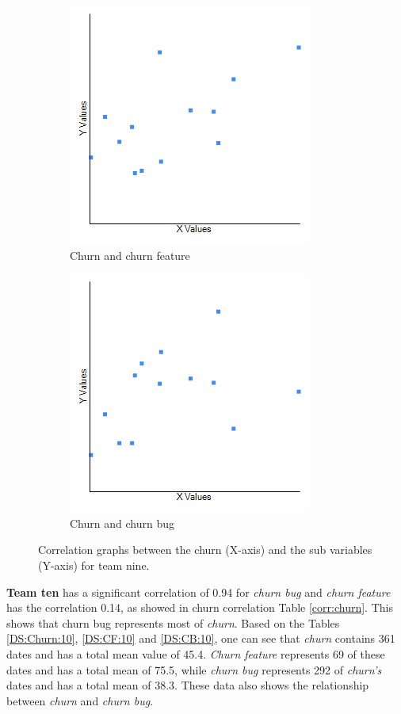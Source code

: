 \documentclass[UKenglish]{ifimaster}  %
\begin{document}
\begin{minipage}[t]{\linewidth}
\begin{figure}[H] 
  \begin{subfigure}[b]{0.5\textwidth}
    \center
\includegraphics[scale=0.6]{Picture/Nine/ChurnVsChurnFT.png}
 \caption{Churn and churn feature} 
 \label{fig:a:9}
  \end{subfigure}
  \begin{subfigure}[b]{0.5\textwidth}
  \center
\includegraphics[scale=0.6]{Picture/Nine/ChurnVsChurnB.png}
 \caption{Churn and churn bug} 
\label{fig:b:9}
  \end{subfigure}
\caption{Correlation graphs between the churn (X-axis)  and the sub variables (Y-axis) for team nine.}
\label{corr:Difference:9}
\end{figure}
\end{minipage}

\textbf{Team ten} has a significant correlation of 0.94 for \textit{churn bug} and \textit{churn feature} has the correlation 0.14, as showed in {churn} correlation Table \ref{corr:churn}. This shows that churn bug represents most of \textit{churn}.  Based on the Tables \ref{DS:Churn:10}, \ref{DS:CF:10} and \ref{DS:CB:10}, one can see that \textit{churn} contains 361 dates and has a total mean value of 45.4. \textit{Churn feature} represents 69 of these dates and has a total mean of 75.5, while \textit{churn bug} represents 292 of \textit{churn's} dates and has a total mean of 38.3. These data also shows the relationship between \textit{churn} and \textit{churn bug}.  
\end{document}
